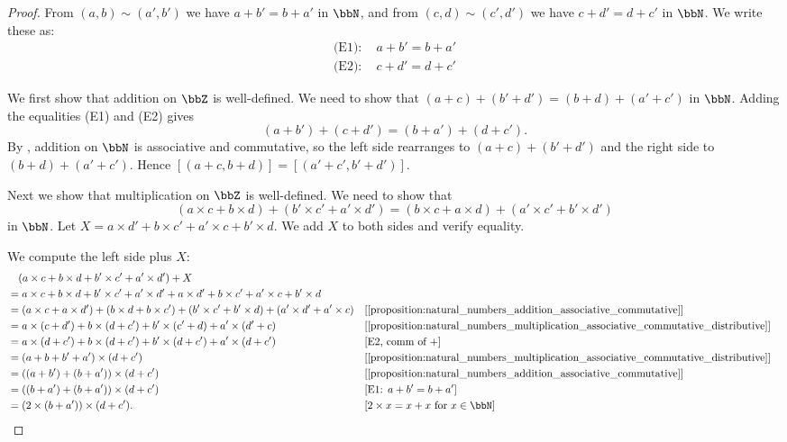 \begin{proof}
From $(a, b) \sim (a', b')$ we have $a + b' = b + a'$ in $\bbN$, and from $(c, d) \sim (c', d')$ we have $c + d' = d + c'$ in $\bbN$. We write these as:
\begin{align*}
\text{(E1)}:\quad a + b' = b + a' \\
\text{(E2)}:\quad c + d' = d + c'
\end{align*}

We first show that addition on $\bbZ$ is well-defined. We need to show that $(a+c) + (b'+d') = (b+d) + (a'+c')$ in $\bbN$. Adding the equalities (E1) and (E2) gives
$$(a + b') + (c + d') = (b + a') + (d + c').$$
By , addition on $\bbN$ is associative and commutative, so the left side rearranges to $(a+c) + (b'+d')$ and the right side to $(b+d) + (a'+c')$. Hence $[(a+c, b+d)] = [(a'+c', b'+d')]$.

Next we show that multiplication on $\bbZ$ is well-defined. We need to show that 
$$(a \times c + b \times d) + (b' \times c' + a' \times d') = (b \times c + a \times d) + (a' \times c' + b' \times d')$$
in $\bbN$. Let $X = a \times d' + b \times c' + a' \times c + b' \times d$. We add $X$ to both sides and verify equality.

We compute the left side plus $X$:
\begin{align*}
&\quad (a \times c + b \times d + b' \times c' + a' \times d') + X \\
&= a \times c + b \times d + b' \times c' + a' \times d' + a \times d' + b \times c' + a' \times c + b' \times d \\
&= (a \times c + a \times d') + (b \times d + b \times c') + (b' \times c' + b' \times d) + (a' \times d' + a' \times c) && \text{[\Cref{proposition:natural_numbers_addition_associative_commutative}]} \\
&= a \times (c + d') + b \times (d + c') + b' \times (c' + d) + a' \times (d' + c) && \text{[\Cref{proposition:natural_numbers_multiplication_associative_commutative_distributive}]} \\
&= a \times (d + c') + b \times (d + c') + b' \times (d + c') + a' \times (d + c') && \text{[E2, comm of $+$]} \\
&= (a + b + b' + a') \times (d + c') && \text{[\Cref{proposition:natural_numbers_multiplication_associative_commutative_distributive}]} \\
&= ((a + b') + (b + a')) \times (d + c') && \text{[\Cref{proposition:natural_numbers_addition_associative_commutative}]} \\
&= ((b + a') + (b + a')) \times (d + c') && \text{[E1: $a+b'=b+a'$]} \\
&= (2 \times (b + a')) \times (d + c'). && \text{[$2 \times x = x + x$ for $x \in \bbN$]}
\end{align*}


\end{proof}
